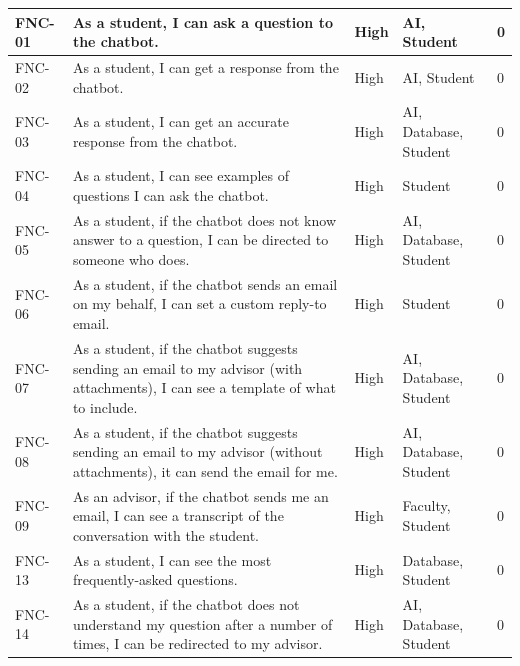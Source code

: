 \documentclass[titlepage, 12pt]{article}
\begin{document}
\begin{center}
\begin{longtable}{ L{1.5cm} L{4cm} L{1.5cm} L{3cm} L{1.5cm} }
        \midrule
        FNC-01 & As a student, I can ask a question to the chatbot.                                                                                & High   & AI, Student          & 0    \\
        \midrule
        FNC-02 & As a student, I can get a response from the chatbot.                                                                              & High   & AI, Student          & 0   \\
        \midrule
        FNC-03 & As a student, I can get an accurate response from the chatbot.                                                                    & High   & AI, Database, Student & 0   \\
        \midrule
        FNC-04 & As a student, I can see examples of questions I can ask the chatbot.                                                              & High   & Student             & 0    \\
        \midrule
        FNC-05 & As a student, if the chatbot does not know answer to a question, I can be directed to someone who does.                           & High   & AI, Database, Student & 0    \\
        \midrule
        FNC-06 & As a student, if the chatbot sends an email on my behalf, I can set a custom reply-to email.                                      & High   & Student             & 0    \\
        \midrule
        FNC-07 & As a student, if the chatbot suggests sending an email to my advisor (with attachments), I can see a template of what to include. & High   & AI, Database, Student & 0    \\
        \midrule
        FNC-08 & As a student, if the chatbot suggests sending an email to my advisor (without attachments), it can send the email for me.         & High   & AI, Database, Student & 0    \\
        \midrule
        FNC-09 & As an advisor, if the chatbot sends me an email, I can see a transcript of the conversation with the student.                     & High   & Faculty, Student     & 0    \\
        \midrule
        FNC-13 & As a student, I can see the most frequently-asked questions.                                                                      & High   & Database, Student    & 0      \\
        \midrule
        FNC-14 & As a student, if the chatbot does not understand my question after a number of times, I can be redirected to my advisor.          & High   & AI, Database, Student & 0      \\

\end{longtable}
\end{center}
\end{document}
